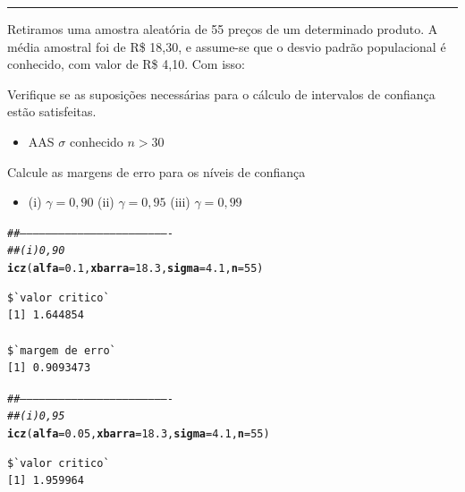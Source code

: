 \documentclass[a4paper,11pt,fleqn]{article}\usepackage[]{graphicx}\usepackage[]{color}
\makeatletter
\newcommand{\hlnum}[1]{\textcolor[rgb]{0,0,0}{#1}}%
\newcommand{\hlcom}[1]{\textcolor[rgb]{0.4,0.4,0.4}{\textit{#1}}}%
\newcommand{\hlstd}[1]{\textcolor[rgb]{0,0,0}{#1}}%
\newcommand{\hlkwc}[1]{\textcolor[rgb]{0,0,0}{\textbf{#1}}}%
\newcommand{\hlkwd}[1]{\textcolor[rgb]{0,0,0}{\textbf{#1}}}%
\newenvironment{kframe}{%
 \def\at@end@of@kframe{}%
 \ifinner\ifhmode%
  \def\at@end@of@kframe{\end{minipage}}%
  \begin{minipage}{\columnwidth}%
 \fi\fi%
 \def\FrameCommand##1{\hskip\@totalleftmargin \hskip-\fboxsep
 \colorbox{shadecolor}{##1}\hskip-\fboxsep
     \hskip-\linewidth \hskip-\@totalleftmargin \hskip\columnwidth}%
 \MakeFramed {\advance\hsize-\width
   \@totalleftmargin\z@ \linewidth\hsize
   \@setminipage}}%
 {\par\unskip\endMakeFramed%
 \at@end@of@kframe}
\newenvironment{knitrout}{}{} %
\theoremstyle{definition}
\makeatother
\begin{document}
\vspace{0.3cm}
\hrule
\vspace{0.3cm}

\begin{compactenum}[4.]
\item Retiramos uma amostra aleatória de 55 preços de um determinado
  produto. A média amostral foi de R\$ 18,30, e assume-se que o desvio
  padrão populacional é conhecido, com valor de R\$ 4,10. Com isso:
  \begin{compactenum}
  \item Verifique se as suposições necessárias para o cálculo de
    intervalos de confiança estão satisfeitas.
    \begin{itemize}
    \item[] AAS \checkmark \quad $\sigma$ conhecido \checkmark
      \quad $n>30$ \checkmark
    \end{itemize}
  \item Calcule as margens de erro para os níveis de confiança
    \begin{itemize}
    \item[] (i) $\gamma = 0,90$ \quad (ii) $\gamma = 0,95$ \quad
      (iii) $\gamma = 0,99$
    \end{itemize}
\begin{knitrout}\small
{}\color{fgcolor}\begin{kframe}
\begin{alltt}
\hlcom{##----------------------------------------------------------------------}
\hlcom{## (i) 0,90}
\hlkwd{icz}\hlstd{(}\hlkwc{alfa} \hlstd{=} \hlnum{0.1}\hlstd{,} \hlkwc{xbarra} \hlstd{=} \hlnum{18.3}\hlstd{,} \hlkwc{sigma} \hlstd{=} \hlnum{4.1}\hlstd{,} \hlkwc{n} \hlstd{=} \hlnum{55}\hlstd{)}
\end{alltt}
\begin{verbatim}
$`valor critico`
[1] 1.644854

$`margem de erro`
[1] 0.9093473
\end{verbatim}
\begin{alltt}
\hlcom{##----------------------------------------------------------------------}
\hlcom{## (i) 0,95}
\hlkwd{icz}\hlstd{(}\hlkwc{alfa} \hlstd{=} \hlnum{0.05}\hlstd{,} \hlkwc{xbarra} \hlstd{=} \hlnum{18.3}\hlstd{,} \hlkwc{sigma} \hlstd{=} \hlnum{4.1}\hlstd{,} \hlkwc{n} \hlstd{=} \hlnum{55}\hlstd{)}
\end{alltt}
\begin{verbatim}
$`valor critico`
[1] 1.959964


\end{verbatim}
\end{kframe}
\end{knitrout}
\end{compactenum}
\end{compactenum}
\end{document}
